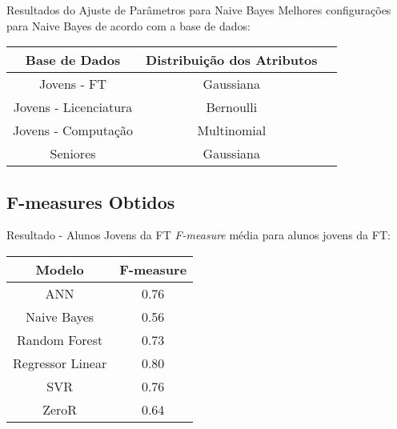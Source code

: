 \begin{frame}{Resultados do Ajuste de Parâmetros para Naive Bayes}
    Melhores configurações para Naive Bayes de acordo com a base de dados: 
    \begin{table}
    \begin{center}
    \begin{tabular}[c]{| c | c | c |}
        \hline
        \textbf{Base de Dados} & \textbf{Distribuição dos Atributos} \\
        \hline
        Jovens - FT & Gaussiana \\
        \hline
        Jovens - Licenciatura & Bernoulli \\
        \hline
        Jovens - Computação & Multinomial \\
        \hline
        Seniores & Gaussiana \\
        \hline
    \end{tabular}
    \end{center}
    \label{conf_nb}
    \end{table}
\end{frame}

\subsection{F-measures Obtidos}
\begin{frame}{Resultado - Alunos Jovens da FT}
    \textit{F-measure} média para alunos jovens da FT: 
    \begin{table}
    \begin{center}
    \begin{tabular}[c]{| c | c |}
        \hline
        \textbf{Modelo} & \textbf{F-measure} \\
        \hline
        ANN              & 0.76 \\
        \hline
        Naive Bayes      & 0.56 \\
        \hline
        Random Forest    & 0.73 \\
        \hline
        Regressor Linear & 0.80 \\
        \hline
        SVR              & 0.76 \\
        \hline
        ZeroR            & 0.64 \\
        \hline
    \end{tabular}
    \end{center}
    \end{table}
\end{frame}

